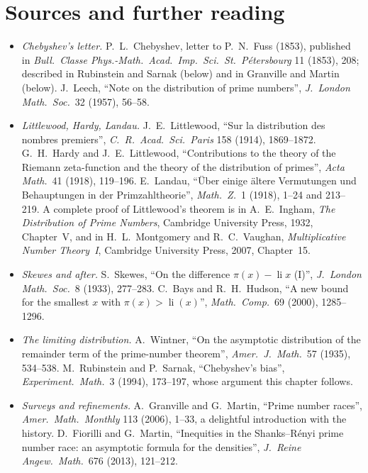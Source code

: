 \section*{Sources and further reading}

\begin{itemize}
\item \emph{Chebyshev's letter.} P.~L.~Chebyshev, letter to P.~N.~Fuss (1853), published in \emph{Bull.\ Classe Phys.-Math.\ Acad.\ Imp.\ Sci.\ St.\ Pétersbourg} 11 (1853), 208; described in Rubinstein and Sarnak (below) and in Granville and Martin (below). J.~Leech, ``Note on the distribution of prime numbers'', \emph{J.\ London Math.\ Soc.}\ 32 (1957), 56--58.
\item \emph{Littlewood, Hardy, Landau.} J.~E.~Littlewood, ``Sur la distribution des nombres premiers'', \emph{C.\ R.\ Acad.\ Sci.\ Paris} 158 (1914), 1869--1872. G.~H.~Hardy and J.~E.~Littlewood, ``Contributions to the theory of the Riemann zeta-function and the theory of the distribution of primes'', \emph{Acta Math.}\ 41 (1918), 119--196. E.~Landau, ``Über einige ältere Vermutungen und Behauptungen in der Primzahltheorie'', \emph{Math.\ Z.}\ 1 (1918), 1--24 and 213--219. A complete proof of Littlewood's theorem is in A.~E.~Ingham, \emph{The Distribution of Prime Numbers}, Cambridge University Press, 1932, Chapter~V, and in H.~L.~Montgomery and R.~C.~Vaughan, \emph{Multiplicative Number Theory~I}, Cambridge University Press, 2007, Chapter~15.
\item \emph{Skewes and after.} S.~Skewes, ``On the difference $\pi(x)-\operatorname{li}x$ (I)'', \emph{J.\ London Math.\ Soc.}\ 8 (1933), 277--283. C.~Bays and R.~H.~Hudson, ``A new bound for the smallest $x$ with $\pi(x)>\operatorname{li}(x)$'', \emph{Math.\ Comp.}\ 69 (2000), 1285--1296.
\item \emph{The limiting distribution.} A.~Wintner, ``On the asymptotic distribution of the remainder term of the prime-number theorem'', \emph{Amer.\ J.\ Math.}\ 57 (1935), 534--538. M.~Rubinstein and P.~Sarnak, ``Chebyshev's bias'', \emph{Experiment.\ Math.}\ 3 (1994), 173--197, whose argument this chapter follows.
\item \emph{Surveys and refinements.} A.~Granville and G.~Martin, ``Prime number races'', \emph{Amer.\ Math.\ Monthly} 113 (2006), 1--33, a delightful introduction with the history. D.~Fiorilli and G.~Martin, ``Inequities in the Shanks--Rényi prime number race: an asymptotic formula for the densities'', \emph{J.\ Reine Angew.\ Math.}\ 676 (2013), 121--212.
\end{itemize}
